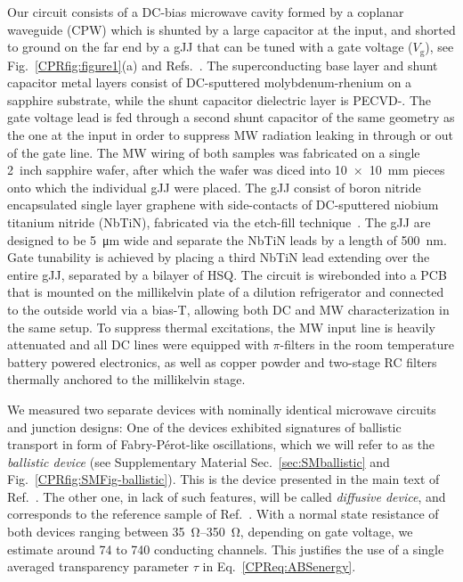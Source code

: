 Our circuit consists of a DC-bias microwave cavity formed by a coplanar waveguide (CPW) which is shunted by a large capacitor at the input, and shorted to ground on the far end by a gJJ that can be tuned with a gate voltage ($V_\text{g}$), see Fig.~\ref{CPRfig:figure1}(a) and Refs.~\cite{schmidtBallisticGrapheneSuperconducting2018,schmidtCurrentDetectionUsing2020,bosmanBroadbandArchitectureGalvanically2015c}.
%
The superconducting base layer and shunt capacitor metal layers consist of DC-sputtered molybdenum-rhenium on a sapphire substrate, while the shunt capacitor dielectric layer is PECVD-.
%
The gate voltage lead is fed through a second shunt capacitor of the same geometry as the one at the input in order to suppress MW radiation leaking in through or out of the gate line.
%
The MW wiring of both samples was fabricated on a single \SI{2}{inch} sapphire wafer, after which the wafer was diced into \SI{10x10}{\milli\meter} pieces onto which the individual gJJ were placed.
%
The gJJ consist of boron nitride encapsulated single layer graphene with side-contacts of DC-sputtered niobium titanium nitride (NbTiN), fabricated via the etch-fill technique~\cite{wangOneDimensionalElectricalContact2013b,schmidtBallisticGrapheneSuperconducting2018}.
%
The gJJ are designed to be \SI{5}{\micro\meter} wide and separate the NbTiN leads by a length of \SI{500}{\nano\meter}.
%
Gate tunability is achieved by placing a third NbTiN lead extending over the entire gJJ, separated by a bilayer of HSQ.
%
The circuit is wirebonded into a PCB that is mounted on the millikelvin plate of a dilution refrigerator and connected to the outside world via a bias-T, allowing both DC and MW characterization in the same setup.
%
To suppress thermal excitations, the MW input line is heavily attenuated and all DC lines were equipped with $\pi$-filters in the room temperature battery powered electronics, as well as copper powder and two-stage RC filters thermally anchored to the millikelvin stage.

We measured two separate devices with nominally identical microwave circuits and junction designs:
%
One of the devices exhibited signatures of ballistic transport in form of Fabry-Pérot-like oscillations, which we will refer to as the \textit{ballistic device} (see Supplementary Material Sec.~\ref{sec:SMballistic} and Fig.~\ref{CPRfig:SMFig-ballistic}).
%
This is the device presented in the main text of Ref.~\cite{schmidtBallisticGrapheneSuperconducting2018}.
%
The other one, in lack of such features, will be called \textit{diffusive device}, and corresponds to the reference sample of Ref.~\cite{schmidtBallisticGrapheneSuperconducting2018}.
%
With a normal state resistance of both devices ranging between \SIrange{35}{350}{\ohm}, depending on gate voltage, we estimate around 74 to 740 conducting channels.
%
This justifies the use of a single averaged transparency parameter $\tau$ in Eq.~\ref{CPReq:ABSenergy}.

